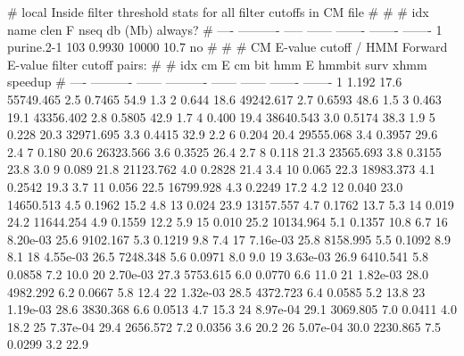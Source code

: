 \begin{sreoutput}
# local Inside filter threshold stats for all filter cutoffs in CM file
#
#
#  idx  name         clen       F     nseq  db (Mb)  always?
# ----  ----------  -----  ------  -------  -------  -------
     1  purine.2-1    103  0.9930    10000     10.7       no
#
#
#       CM E-value cutoff / HMM Forward E-value filter cutoff pairs:
#
#       idx         cm E  cm bit       hmm E  hmmbit    surv     xhmm  speedup
#       ----  ----------  ------  ----------  ------  ------  -------  -------
           1       1.192    17.6   55749.465     2.5  0.7465     54.9      1.3
           2       0.644    18.6   49242.617     2.7  0.6593     48.6      1.5
           3       0.463    19.1   43356.402     2.8  0.5805     42.9      1.7
           4       0.400    19.4   38640.543     3.0  0.5174     38.3      1.9
           5       0.228    20.3   32971.695     3.3  0.4415     32.9      2.2
           6       0.204    20.4   29555.068     3.4  0.3957     29.6      2.4
           7       0.180    20.6   26323.566     3.6  0.3525     26.4      2.7
           8       0.118    21.3   23565.693     3.8  0.3155     23.8      3.0
           9       0.089    21.8   21123.762     4.0  0.2828     21.4      3.4
          10       0.065    22.3   18983.373     4.1  0.2542     19.3      3.7
          11       0.056    22.5   16799.928     4.3  0.2249     17.2      4.2
          12       0.040    23.0   14650.513     4.5  0.1962     15.2      4.8
          13       0.024    23.9   13157.557     4.7  0.1762     13.7      5.3
          14       0.019    24.2   11644.254     4.9  0.1559     12.2      5.9
          15       0.010    25.2   10134.964     5.1  0.1357     10.8      6.7
          16    8.20e-03    25.6    9102.167     5.3  0.1219      9.8      7.4
          17    7.16e-03    25.8    8158.995     5.5  0.1092      8.9      8.1
          18    4.55e-03    26.5    7248.348     5.6  0.0971      8.0      9.0
          19    3.63e-03    26.9    6410.541     5.8  0.0858      7.2     10.0
          20    2.70e-03    27.3    5753.615     6.0  0.0770      6.6     11.0
          21    1.82e-03    28.0    4982.292     6.2  0.0667      5.8     12.4
          22    1.32e-03    28.5    4372.723     6.4  0.0585      5.2     13.8
          23    1.19e-03    28.6    3830.368     6.6  0.0513      4.7     15.3
          24    8.97e-04    29.1    3069.805     7.0  0.0411      4.0     18.2
          25    7.37e-04    29.4    2656.572     7.2  0.0356      3.6     20.2
          26    5.07e-04    30.0    2230.865     7.5  0.0299      3.2     22.9

\end{sreoutput}
